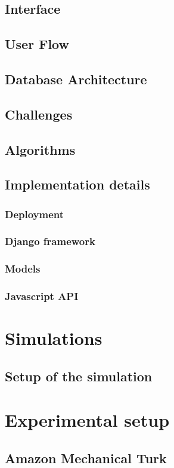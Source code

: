 \documentclass{book}
\begin{document}
\section{Interface}
\section{User Flow}
\section{Database Architecture}
\section{Challenges}
\section{Algorithms}
\section{Implementation details}
\subsection{Deployment}
\subsection{Django framework}
\subsection{Models}
\subsection{Javascript API}
\chapter{Simulations}
\section{Setup of the simulation}
\chapter{Experimental setup}
\section{Amazon Mechanical Turk}
\end{document}
